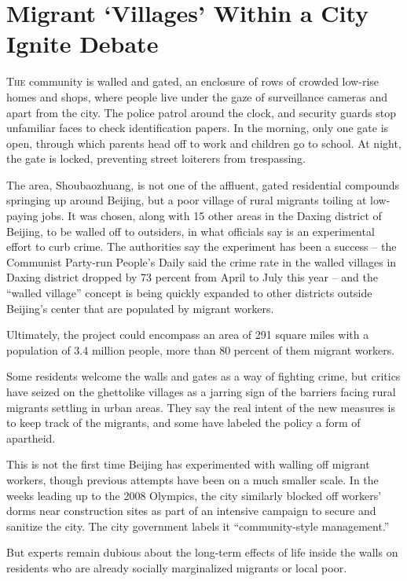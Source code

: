 ﻿\documentclass[12pt]{article}
\begin{document}
\section{Migrant `Villages' Within a City Ignite Debate}

\lettrine{T}{he} community is walled and gated, an enclosure of rows of
crowded low-rise homes and shops, where people live under the gaze of surveillance cameras and apart
from the city. The police patrol around the clock, and security guards stop unfamiliar faces to
check identification papers. In the morning, only one gate is open, through which parents head off
to work and children go to school. At night, the gate is locked, preventing street loiterers from
trespassing.

The area, Shoubaozhuang, is not one of the affluent, gated residential compounds springing up around
Beijing, but a poor village of rural migrants toiling at low-paying jobs. It was chosen, along with
15 other areas in the Daxing district of Beijing, to be walled off to outsiders, in what officials
say is an experimental effort to curb crime. The authorities say the experiment has been a success
-- the Communist Party-run People's Daily said the crime rate in the walled villages in Daxing
district dropped by 73 percent from April to July this year -- and the ``walled village'' concept is
being quickly expanded to other districts outside Beijing's center that are populated by migrant
workers.

Ultimately, the project could encompass an area of 291 square miles with a population of 3.4 million
people, more than 80 percent of them migrant workers.

Some residents welcome the walls and gates as a way of fighting crime, but critics have seized on
the ghettolike villages as a jarring sign of the barriers facing rural migrants settling in urban
areas. They say the real intent of the new measures is to keep track of the migrants, and some have
labeled the policy a form of apartheid.

This is not the first time Beijing has experimented with walling off migrant workers, though
previous attempts have been on a much smaller scale. In the weeks leading up to the 2008 Olympics,
the city similarly blocked off workers' dorms near construction sites as part of an intensive
campaign to secure and sanitize the city. The city government labels it ``community-style
management.''

But experts remain dubious about the long-term effects of life inside the walls on residents who are
already socially marginalized migrants or local poor.
\end{document}

